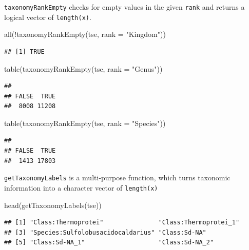 \documentclass[
]{book}
\newenvironment{Shaded}{\begin{snugshade}}{\end{snugshade}}
\newcommand{\AttributeTok}[1]{\textcolor[rgb]{0.77,0.63,0.00}{#1}}
\newcommand{\FunctionTok}[1]{\textcolor[rgb]{0.00,0.00,0.00}{#1}}
\newcommand{\NormalTok}[1]{#1}
\newcommand{\SpecialCharTok}[1]{\textcolor[rgb]{0.00,0.00,0.00}{#1}}
\newcommand{\StringTok}[1]{\textcolor[rgb]{0.31,0.60,0.02}{#1}}
\begin{document}
\texttt{taxonomyRankEmpty} checks for empty values in the given \texttt{rank} and returns a
logical vector of \texttt{length(x)}.

\begin{Shaded}
\begin{Highlighting}[]
\FunctionTok{all}\NormalTok{(}\SpecialCharTok{!}\FunctionTok{taxonomyRankEmpty}\NormalTok{(tse, }\AttributeTok{rank =} \StringTok{"Kingdom"}\NormalTok{))}
\end{Highlighting}
\end{Shaded}

\begin{verbatim}
## [1] TRUE
\end{verbatim}

\begin{Shaded}
\begin{Highlighting}[]
\FunctionTok{table}\NormalTok{(}\FunctionTok{taxonomyRankEmpty}\NormalTok{(tse, }\AttributeTok{rank =} \StringTok{"Genus"}\NormalTok{))}
\end{Highlighting}
\end{Shaded}

\begin{verbatim}
## 
## FALSE  TRUE 
##  8008 11208
\end{verbatim}

\begin{Shaded}
\begin{Highlighting}[]
\FunctionTok{table}\NormalTok{(}\FunctionTok{taxonomyRankEmpty}\NormalTok{(tse, }\AttributeTok{rank =} \StringTok{"Species"}\NormalTok{))}
\end{Highlighting}
\end{Shaded}

\begin{verbatim}
## 
## FALSE  TRUE 
##  1413 17803
\end{verbatim}

\texttt{getTaxonomyLabels} is a multi-purpose function, which turns taxonomic
information into a character vector of \texttt{length(x)}

\begin{Shaded}
\begin{Highlighting}[]
\FunctionTok{head}\NormalTok{(}\FunctionTok{getTaxonomyLabels}\NormalTok{(tse))}
\end{Highlighting}
\end{Shaded}

\begin{verbatim}
## [1] "Class:Thermoprotei"               "Class:Thermoprotei_1"            
## [3] "Species:Sulfolobusacidocaldarius" "Class:Sd-NA"                     
## [5] "Class:Sd-NA_1"                    "Class:Sd-NA_2"
\end{verbatim}
\end{document}
